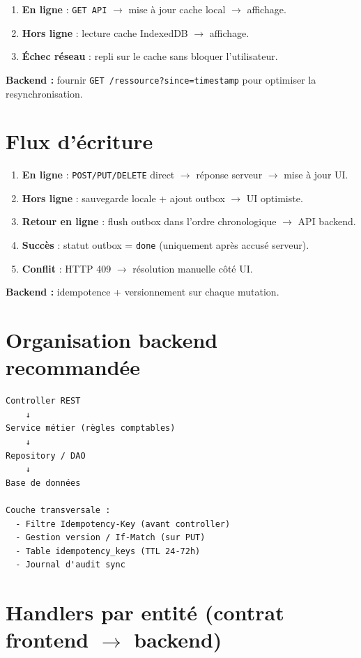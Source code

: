 \documentclass[12pt,a4paper]{report}
\begin{document}
\begin{enumerate}
  \item \textbf{En ligne} : \texttt{GET API} $\rightarrow$ mise à jour cache local $\rightarrow$ affichage.
  \item \textbf{Hors ligne} : lecture cache IndexedDB $\rightarrow$ affichage.
  \item \textbf{Échec réseau} : repli sur le cache sans bloquer l'utilisateur.
\end{enumerate}

\textbf{Backend :} fournir \texttt{GET /ressource?since=timestamp} pour optimiser la resynchronisation.

\section{Flux d'écriture}

\begin{enumerate}
  \item \textbf{En ligne} : \texttt{POST/PUT/DELETE} direct $\rightarrow$ réponse serveur $\rightarrow$ mise à jour UI.
  \item \textbf{Hors ligne} : sauvegarde locale + ajout outbox $\rightarrow$ UI optimiste.
  \item \textbf{Retour en ligne} : flush outbox dans l'ordre chronologique $\rightarrow$ API backend.
  \item \textbf{Succès} : statut outbox = \texttt{done} (uniquement après accusé serveur).
  \item \textbf{Conflit} : HTTP 409 $\rightarrow$ résolution manuelle côté UI.
\end{enumerate}

\textbf{Backend :} idempotence + versionnement sur chaque mutation.

\section{Organisation backend recommandée}

\begin{verbatim}
Controller REST
    ↓
Service métier (règles comptables)
    ↓
Repository / DAO
    ↓
Base de données

Couche transversale :
  - Filtre Idempotency-Key (avant controller)
  - Gestion version / If-Match (sur PUT)
  - Table idempotency_keys (TTL 24-72h)
  - Journal d'audit sync
\end{verbatim}

\section{Handlers par entité (contrat frontend $\rightarrow$ backend)}
\end{document}
